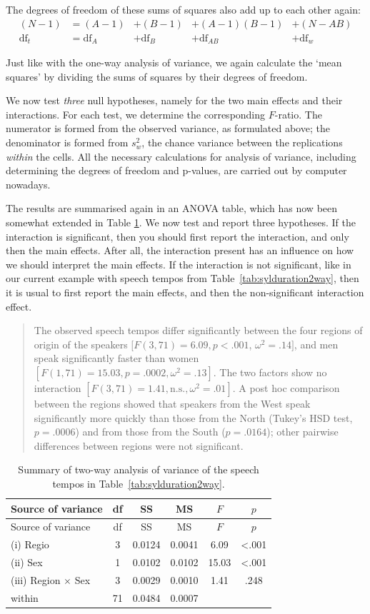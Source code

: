 \documentclass[
]{book}
\begin{document}
The degrees of freedom of these sums of squares also add up to each other
again:
\begin{align}
  \label{eq:dftotal2}
    { (N-1) } &= (A-1) &+ (B-1) &+ (A-1)(B-1) &+ (N-AB) \\
    \textrm{df}_t &= \textrm{df}_A &+ \textrm{df}_B &+ \textrm{df}_{AB} &+ \textrm{df}_w
\end{align}

Just like with the one-way analysis of variance, we again calculate the
`mean squares' by dividing the sums of squares by their degrees of freedom.

We now test \emph{three} null hypotheses, namely for the two main effects and their
interactions. For each test, we determine the corresponding
\(F\)-ratio. The numerator is formed from the observed variance,
as formulated above; the denominator is formed from \(s^2_w\), the
chance variance between the replications \emph{within} the cells. All
the necessary calculations for analysis of variance, including determining
the degrees of freedom and p-values, are carried out by computer
nowadays.

The results are summarised again in an ANOVA table, which has now been somewhat
extended in Table \ref{tab:syldur2way-anova}. We now test and report three
hypotheses. If the interaction is significant, then you should first report
the interaction, and only then the main effects. After all, the interaction present
has an influence on how we should interpret the main effects. If the interaction
is not significant, like in our current example with speech tempos from
Table~\ref{tab:sylduration2way}, then it is usual to first report the main
effects, and then the non-significant interaction effect.

\begin{quote}
The observed speech tempos differ significantly between the four
regions of origin of the speakers
\([F(3,71)=6.09, p<.001\), \(\omega^2=.14]\), and men speak significantly faster
than women \([F(1,71)=15.03, p=.0002, \omega^2=.13]\).
The two factors show no interaction
\([F(3,71)=1.41, \textrm{n.s.}, \omega^2=.01]\).
A post hoc comparison between the regions showed that speakers from
the West speak significantly more quickly than those from the North (Tukey's
HSD test, \(p=.0006\)) and from those from the South (\(p=.0164\)); other
pairwise differences between regions were not significant.
\end{quote}

\begin{longtable}[]{@{}lccccc@{}}
\caption{\label{tab:syldur2way-anova} Summary of two-way analysis of variance of the speech
tempos in Table~\ref{tab:sylduration2way}.}\tabularnewline
\toprule
Source of variance & df & SS & MS & \(F\) & \(p\)\tabularnewline
\midrule
\endfirsthead
\toprule
Source of variance & df & SS & MS & \(F\) & \(p\)\tabularnewline
\midrule
\endhead
(i) Regio & 3 & 0.0124 & 0.0041 & 6.09 & \textless.001\tabularnewline
(ii) Sex & 1 & 0.0102 & 0.0102 & 15.03 & \textless.001\tabularnewline
(iii) Region \(\times\) Sex & 3 & 0.0029 & 0.0010 & 1.41 & .248\tabularnewline
within & 71 & 0.0484 & 0.0007 & &\tabularnewline
\bottomrule
\end{longtable}
\end{document}
